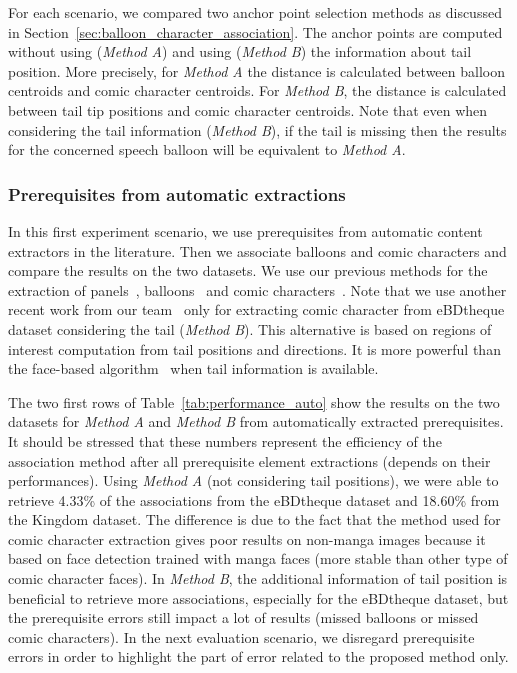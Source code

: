 \documentclass[conference]{IEEEtran}
\begin{document}
For each scenario, we compared two anchor point selection methods as discussed in Section~\ref{sec:balloon_character_association}.
The anchor points are computed without using (\emph{Method A}) and using (\emph{Method B}) the information about tail position.
More precisely, for \emph{Method A} the distance is calculated between balloon centroids and comic character centroids.
For \emph{Method B}, the distance is calculated between tail tip positions and comic character centroids.
Note that even when considering the tail information (\emph{Method B}), if the tail is missing then the results for the concerned speech balloon will be equivalent to \emph{Method A}.


\subsubsection{Prerequisites from automatic extractions} %
\label{ssub:prerequiste_from_automatic_extractions}
In this first experiment scenario, we use prerequisites from automatic content extractors in the literature.
Then we associate balloons and comic characters and compare the results on the two datasets.
We use our previous methods for the extraction of panels~\cite{Rigaud2012LNCS}, balloons~\cite{rigaud2013active} and comic characters~\cite{Iwata2014Retrieval}.
Note that we use another recent work from our team~\cite{Guerin2014Reduction} only for extracting comic character from eBDtheque dataset considering the tail (\emph{Method B}).
This alternative is based on regions of interest computation from tail positions and directions.
It is more powerful than the face-based algorithm~\cite{Iwata2014Retrieval} when tail information is available.

The two first rows of Table~\ref{tab:performance_auto} show the results on the two datasets for \emph{Method A} and \emph{Method B} from automatically extracted prerequisites.
It should be stressed that these numbers represent the efficiency of the association method after all prerequisite element extractions (depends on their performances).
Using \emph{Method A} (not considering tail positions), we were able to retrieve 4.33\% of the associations from the eBDtheque dataset and 18.60\% from the Kingdom dataset.
The difference is due to the fact that the method used for comic character extraction gives poor results on non-manga images because it based on face detection trained with manga faces (more stable than other type of comic character faces).
In \emph{Method B}, the additional information of tail position is beneficial to retrieve more associations, especially for the eBDtheque dataset, but the prerequisite errors still impact a lot of results (missed balloons or missed comic characters).
In the next evaluation scenario, we disregard prerequisite errors in order to highlight the part of error related to the proposed method only.
\end{document}
